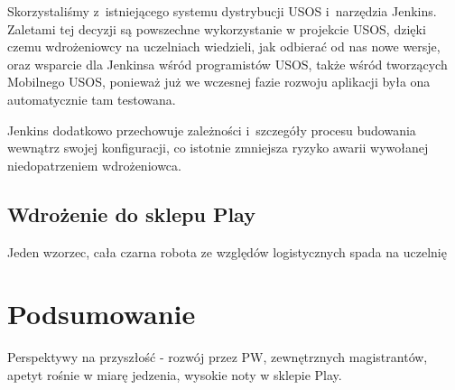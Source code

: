 \documentclass{pracamgr}
\let\cleardoublepage\clearpage
\begin{document}
Skorzystaliśmy z~istniejącego systemu dystrybucji USOS i~narzędzia Jenkins. Zaletami tej decyzji są powszechne
wykorzystanie w projekcie USOS, dzięki czemu wdrożeniowcy na uczelniach wiedzieli, jak odbierać od nas nowe wersje,
oraz wsparcie dla Jenkinsa wśród programistów USOS, także wśród tworzących Mobilnego USOS, ponieważ już we wczesnej
fazie rozwoju aplikacji była ona automatycznie tam testowana.

Jenkins dodatkowo przechowuje zależności i~szczegóły procesu budowania wewnątrz swojej konfiguracji, co istotnie
zmniejsza ryzyko awarii wywołanej niedopatrzeniem wdrożeniowca.

\section{Wdrożenie do sklepu Play}

Jeden wzorzec, cała czarna robota ze względów logistycznych spada na uczelnię

\chapter{Podsumowanie}

Perspektywy na przyszłość - rozwój przez PW, zewnętrznych magistrantów, apetyt rośnie w miarę jedzenia, wysokie noty w sklepie Play.

\appendix

\cleardoublepage
{}
{}
\listoffigures

\cleardoublepage
{}
{}
\listoftables

\end{document}
